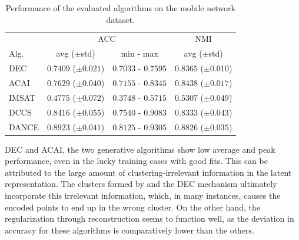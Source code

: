 			
			
			\begin{table}[!ht]
				\centering
				\renewcommand{\arraystretch}{1.25}
				\setlength\tabcolsep{4pt}
				\begin{tabular}{l|c|c|c}
					& \multicolumn{2}{c|}{ACC}                     & NMI \\
					\cline{2-4}
					Alg.       & avg ($\pm$std)         & min - max           & avg ($\pm$std) \\
					\hline
					\ac{DEC}   & $0.7409$ ($\pm0.021$) & $0.7033$ - $0.7595$ & $0.8365$ ($\pm0.010$) \\
					\ac{ACAI}  & $0.7629$ ($\pm0.040$) & $0.7155$ - $0.8345$ & $0.8438$ ($\pm0.017$) \\
					\ac{IMSAT} & $0.4775$ ($\pm0.072$) & $0.3748$ - $0.5715$ & $0.5307$ ($\pm0.049$) \\
					\ac{DCCS}  & $0.8416$ ($\pm0.055$) & $0.7540$ - $0.9083$ & $0.8333$ ($\pm0.043$) \\
					\ac{DANCE} & $\mathbf{0.8923}$ ($\pm0.041$) & $\mathbf{0.8125}$ - $\mathbf{0.9305}$ & $\mathbf{0.8826}$ ($\pm0.035$) \\
				\end{tabular}
				\caption[Deep clustering algorithm performance on the DANCE mobile network dataset]{Performance of the evaluated algorithms on the mobile network dataset.}
				\label{tab:mobile_perf}
			\end{table}
			
			\ac{DEC} and \ac{ACAI}, the two generative algorithms show low average and peak performance, even in the lucky training cases with good \kmeans{} fits.
			This can be attributed to the large amount of clustering-irrelevant information in the latent representation.
			The clusters formed by \kmeans{} and the \ac{DEC} mechanism ultimately incorporate this irrelevant information, which, in many instances, causes the encoded points to end up in the wrong cluster.
			On the other hand, the regularization through reconstruction seems to function well, as the deviation in accuracy for these algorithms is comparatively lower than the others.
			
